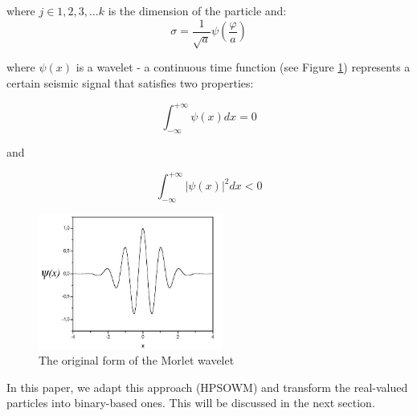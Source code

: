 where $j \in 1,2,3, \ldots k$ is the dimension of the particle and:
\begin{equation}
	\sigma = \frac{1}{\sqrt{a}}\psi(\frac{\varphi}{a})
\end{equation}

where $\psi(x)$ is a wavelet - a continuous time function (see Figure \ref{fig:fig1}) represents a certain seismic signal that satisfies two properties:

\begin{equation}
	\int_{-\infty}^{+\infty}\psi(x)dx = 0
\end{equation}

and

\begin{equation}
	\int_{-\infty}^{+\infty}|\psi(x)|^2dx < 0
\end{equation}

\begin{figure} [H]
\centering
\includegraphics[width=60.72mm]{resources/morlet1}
\caption{The original form of the Morlet wavelet}\label{fig:fig1}
\end{figure}

In this paper, we adapt this approach (HPSOWM) and transform the real-valued particles into binary-based ones. This will be discussed in the next section.